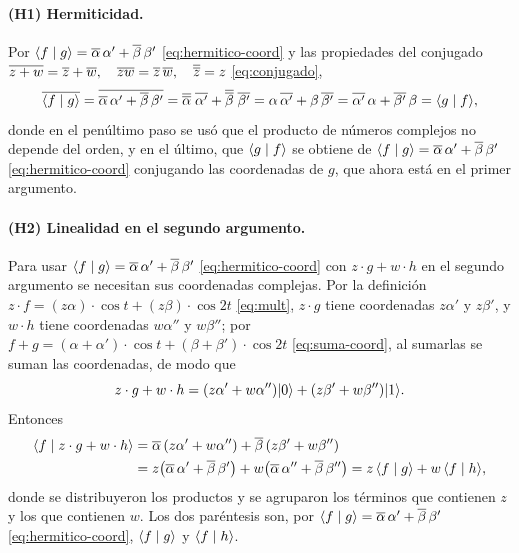 \paragraph{(H1) Hermiticidad.}
Por $\langle f\mid g\rangle=\overline\alpha\,\alpha'+\overline\beta\,\beta'$ \eqref{eq:hermitico-coord} y las propiedades del conjugado $\overline{z+w}=\overline z+\overline w,\quad\penalty0 \overline{zw}=\overline z\,\overline w,\quad\penalty0 \overline{\overline z}=z$ \eqref{eq:conjugado},
\[
  \overline{\langle f\mid g\rangle}
  =\overline{\overline\alpha\,\alpha'+\overline\beta\,\beta'}
  =\overline{\overline\alpha}\;\overline{\alpha'}+\overline{\overline\beta}\;\overline{\beta'}
  =\alpha\,\overline{\alpha'}+\beta\,\overline{\beta'}
  =\overline{\alpha'}\,\alpha+\overline{\beta'}\,\beta
  =\langle g\mid f\rangle ,
\]
donde en el penúltimo paso se usó que el producto de números complejos no depende del orden,
y en el último, que $\langle g\mid f\rangle$ se obtiene de $\langle f\mid g\rangle=\overline\alpha\,\alpha'+\overline\beta\,\beta'$ \eqref{eq:hermitico-coord} conjugando las
coordenadas de $g$, que ahora está en el primer argumento.

\paragraph{(H2) Linealidad en el segundo argumento.}
Para usar $\langle f\mid g\rangle=\overline\alpha\,\alpha'+\overline\beta\,\beta'$ \eqref{eq:hermitico-coord} con $z\cdot g+w\cdot h$ en el segundo argumento se
necesitan sus coordenadas complejas. Por la definición $z\cdot f=(z\alpha)\cdot\cos t+(z\beta)\cdot\cos 2t$ \eqref{eq:mult}, $z\cdot g$ tiene
coordenadas $z\alpha'$ y $z\beta'$, y $w\cdot h$ tiene coordenadas $w\alpha''$ y $w\beta''$;
por $f+g=(\alpha+\alpha')\cdot\cos t+(\beta+\beta')\cdot\cos 2t$ \eqref{eq:suma-coord}, al sumarlas se suman las coordenadas, de modo que
\[
  z\cdot g+w\cdot h=(z\alpha'+w\alpha'')\lvert 0\rangle+(z\beta'+w\beta'')\lvert 1\rangle .
\]
Entonces
\[
\begin{aligned}
  \langle f\mid z\cdot g+w\cdot h\rangle
  &=\overline\alpha\,(z\alpha'+w\alpha'')+\overline\beta\,(z\beta'+w\beta'')\\
  &=z\bigl(\overline\alpha\,\alpha'+\overline\beta\,\beta'\bigr)
   +w\bigl(\overline\alpha\,\alpha''+\overline\beta\,\beta''\bigr)
   =z\,\langle f\mid g\rangle+w\,\langle f\mid h\rangle ,
\end{aligned}
\]
donde se distribuyeron los productos y se agruparon los términos que contienen $z$ y los que
contienen $w$. Los dos paréntesis son, por $\langle f\mid g\rangle=\overline\alpha\,\alpha'+\overline\beta\,\beta'$ \eqref{eq:hermitico-coord}, $\langle f\mid g\rangle$ y $\langle f\mid h\rangle$.

